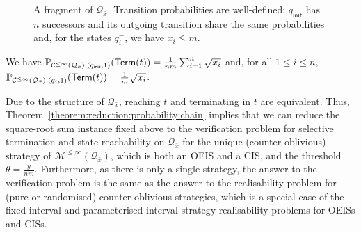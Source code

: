 \documentclass[a4paper,UKenglish,cleveref,autoref,thm-restate,colorlinks]{lipics-v2021}
\newcommand{\init}{\mathsf{init}}
\newcommand{\sqsx}{x} \newcommand{\sqsxVect}{\bar{x}} \newcommand{\sqsm}{m} \newcommand{\sqsy}{y} \newcommand{\sqsi}{i} \newcommand{\sqsn}{n} \newcommand{\sqsSize}{E}
\newcommand{\mdp}{\mathcal{M}}
\newcommand{\ocmdp}{\mathcal{Q}}
\newcommand{\ocmdpFin}[2]{\mdp^{\leq #2}(#1)}
\newcommand{\ocState}{q}
\newcommand{\ocStateC}{t}
\newcommand{\ocAction}{a}
\newcommand{\mchain}{\mathcal{C}}
\newcommand{\ocChainFin}[2]{\mchain^{\leq #2}(#1)}
\newcommand{\chainX}{\ocmdp_{\sqsxVect}}
\newcommand{\termination}{\mathsf{Term}}
\newcommand{\selectiveTermination}[1]{\termination({#1})}
\newcommand{\thresProba}{\theta}
\begin{document}
  \begin{figure}
    \centering
    \caption{A fragment of $\chainX$. Transition probabilities are well-defined: $\ocState_\init$ has $\sqsn$ successors and its outgoing transition share the same probabilities and, for the states $\ocState_\sqsi^-$, we have $\sqsx_\sqsi\leq\sqsm$.}\label{figure:sqs:gadget}
  \end{figure}

  \begin{theorem}\label{theorem:reduction:probability:chain}
    We have $\probaMCverb{\ocChainFin{\chainX}{\infty}}{(\ocState_\init, 1)}(\selectiveTermination{\ocStateC}) = \frac{1}{\sqsn\sqsm}\sum_{\sqsi=1}^\sqsn\sqrt{\sqsx_\sqsi}$ and, for all $1\leq\sqsi\leq\sqsn$, $\probaMCverb{\ocChainFin{\chainX}{\infty}}{(\ocState_\sqsi, 1)}(\selectiveTermination{\ocStateC}) = \frac{1}{\sqsm}\sqrt{\sqsx_\sqsi}$.
\end{theorem}

Due to the structure of $\chainX$, reaching $\ocStateC$ and terminating in $\ocStateC$ are equivalent.
Thus, Theorem~\ref{theorem:reduction:probability:chain} implies that we can reduce the square-root sum instance fixed above to the verification problem for selective termination and state-reachability on $\chainX$ for the unique (counter-oblivious) strategy of $\ocmdpFin{\chainX}{\infty}$, which is both an OEIS and a CIS, and the threshold $\thresProba=\frac{\sqsy}{\sqsn\sqsm}$.
Furthermore, as there is only a single strategy, the answer to the verification problem is the same as the answer to the realisability problem for (pure or randomised) counter-oblivious strategies, which is a special case of the fixed-interval and parameterised interval strategy realisability problems for OEISs and CISs.
\end{document}
